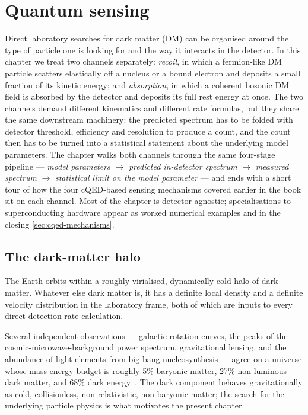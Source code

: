 \chapter{Quantum sensing}
\label{ch:quantum-sensing}

Direct laboratory searches for dark matter (DM) can be organised around
the type of particle one is looking for and the way it interacts in
the detector. In this chapter we treat two channels separately:
\emph{recoil}, in which a fermion-like DM particle scatters elastically
off a nucleus or a bound electron and deposits a small fraction of
its kinetic energy; and \emph{absorption}, in which a coherent
bosonic DM field is absorbed by the detector and deposits its full
rest energy at once. The two channels demand different kinematics
and different rate formulas, but they share the same downstream
machinery: the predicted spectrum has to be folded with detector
threshold, efficiency and resolution to produce a count, and the
count then has to be turned into a statistical statement about the
underlying model parameters. The chapter walks both channels through
the same four-stage pipeline --- \emph{model parameters} $\to$
\emph{predicted in-detector spectrum} $\to$ \emph{measured spectrum}
$\to$ \emph{statistical limit on the model parameter} --- and
ends with a short tour of how the four cQED-based sensing
mechanisms covered earlier in the book sit on each channel. Most of
the chapter is detector-agnostic; specialisations to superconducting
hardware appear as worked numerical examples and in the closing
\cref{sec:cqed-mechanisms}.

\section{The dark-matter halo}
\label{sec:dm-halo}

\begin{phenomenon}
The Earth orbits within a roughly virialised, dynamically cold halo
of dark matter. Whatever else dark matter is, it has a definite
local density and a definite velocity distribution in the
laboratory frame, both of which are inputs to every direct-detection
rate calculation.
\end{phenomenon}

Several independent observations --- galactic rotation curves, the
peaks of the cosmic-microwave-background power spectrum,
gravitational lensing, and the abundance of light elements from
big-bang nucleosynthesis --- agree on a universe whose mass-energy
budget is roughly 5\% baryonic matter, 27\% non-luminous dark
matter, and 68\% dark energy~\cite{bertone2005}. The dark
component behaves gravitationally as cold, collisionless,
non-relativistic, non-baryonic matter; the search for the underlying
particle physics is what motivates the present chapter.

